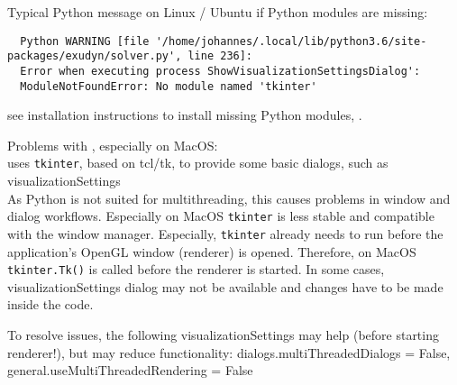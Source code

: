 %
%
\item Typical Python  message on Linux / Ubuntu if Python modules are missing:
\plainlststyle
\begin{lstlisting}
  Python WARNING [file '/home/johannes/.local/lib/python3.6/site-packages/exudyn/solver.py', line 236]: 
  Error when executing process ShowVisualizationSettingsDialog':
  ModuleNotFoundError: No module named 'tkinter'
\end{lstlisting}
\onlyRST{\rstStartNewLine}
%
\item[$\ra$] see installation instructions to install missing Python modules, .

\item Problems with , especially on MacOS:\\
  \codeName uses \texttt{tkinter}, based on tcl/tk, to provide some basic dialogs, such as visualizationSettings\\
  As Python is not suited for multithreading, this causes problems in window and dialog workflows. Especially on MacOS
  \texttt{tkinter} is less stable and compatible with the window manager. Especially, \texttt{tkinter} already needs to run
  before the application's OpenGL window (renderer) is opened. Therefore, on MacOS \texttt{tkinter.Tk()} is called before the 
  renderer is started.
  In some cases, visualizationSettings dialog may not be available and changes have to be made inside the code.
  
\item[$\ra$] To resolve issues, the following visualizationSettings may help (before starting renderer!), but may reduce functionality: 
     dialogs.multiThreadedDialogs = False, general.useMultiThreadedRendering = False
\ei 



